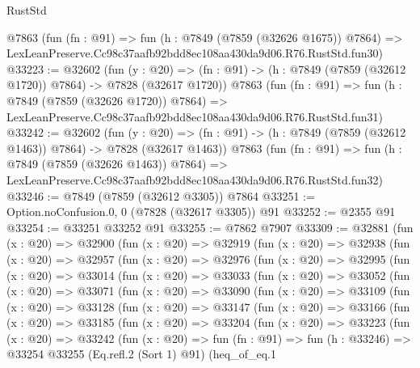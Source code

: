 \begin{lexlean}{RustStd}
\begin{coremodule}
    @7863
    (fun (fn : @91) =>
    fun (h : @7849 (@7859 (@32626 @1675)) @7864) =>
    LexLeanPreserve.Cc98c37aafb92bdd8ec108aa430da9d06.R76.RustStd.fun30)
@33223 := @32602
    (fun (y : @20) =>
    (fn : @91) -> (h : @7849 (@7859 (@32612 @1720)) @7864) -> @7828 (@32617 @1720))
    @7863
    (fun (fn : @91) =>
    fun (h : @7849 (@7859 (@32626 @1720)) @7864) =>
    LexLeanPreserve.Cc98c37aafb92bdd8ec108aa430da9d06.R76.RustStd.fun31)
@33242 := @32602
    (fun (y : @20) =>
    (fn : @91) -> (h : @7849 (@7859 (@32612 @1463)) @7864) -> @7828 (@32617 @1463))
    @7863
    (fun (fn : @91) =>
    fun (h : @7849 (@7859 (@32626 @1463)) @7864) =>
    LexLeanPreserve.Cc98c37aafb92bdd8ec108aa430da9d06.R76.RustStd.fun32)
@33246 := @7849 (@7859 (@32612 @3305)) @7864
@33251 := Option.noConfusion.{0, 0} (@7828 (@32617 @3305)) @91
@33252 := @2355 @91
@33254 := @33251 @33252 @91
@33255 := @7862 @7907
@33309 := @32881
    (fun (x : @20) =>
    @32900
      (fun (x : @20) =>
      @32919
        (fun (x : @20) =>
        @32938
          (fun (x : @20) =>
          @32957
            (fun (x : @20) =>
            @32976
              (fun (x : @20) =>
              @32995
                (fun (x : @20) =>
                @33014
                  (fun (x : @20) =>
                  @33033
                    (fun (x : @20) =>
                    @33052
                      (fun (x : @20) =>
                      @33071
                        (fun (x : @20) =>
                        @33090
                          (fun (x : @20) =>
                          @33109
                            (fun (x : @20) =>
                            @33128
                              (fun (x : @20) =>
                              @33147
                                (fun (x : @20) =>
                                @33166
                                  (fun (x : @20) =>
                                  @33185
                                    (fun (x : @20) =>
                                    @33204
                                      (fun (x : @20) =>
                                      @33223
                                        (fun (x : @20) =>
                                        @33242
                                          (fun (x : @20) =>
                                          fun (fn : @91) =>
                                          fun (h : @33246) =>
                                          @33254
                                            @33255
                                            (Eq.refl.{2} (Sort 1) @91)
                                            (heq_of_eq.{1}

\end{coremodule}
\end{lexlean}
